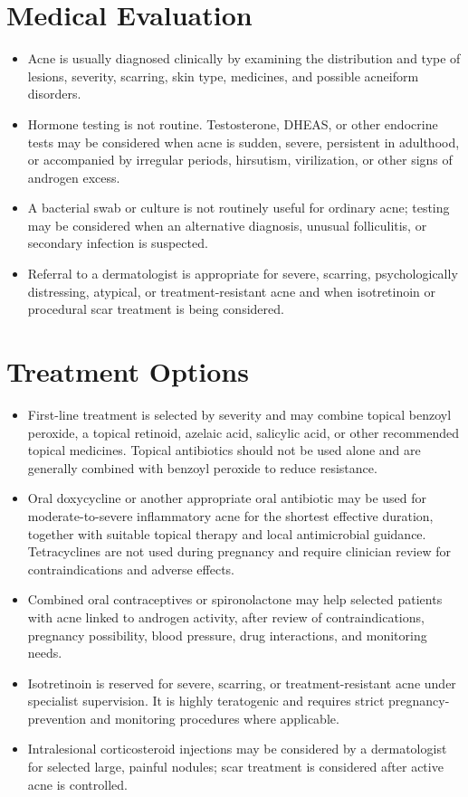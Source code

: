 \section*{Medical Evaluation}
\begin{itemize}
 \item Acne is usually diagnosed clinically by examining the distribution and type of lesions, severity, scarring, skin type, medicines, and possible acneiform disorders.
 \item Hormone testing is not routine. Testosterone, DHEAS, or other endocrine tests may be considered when acne is sudden, severe, persistent in adulthood, or accompanied by irregular periods, hirsutism, virilization, or other signs of androgen excess.
 \item A bacterial swab or culture is not routinely useful for ordinary acne; testing may be considered when an alternative diagnosis, unusual folliculitis, or secondary infection is suspected.
 \item Referral to a dermatologist is appropriate for severe, scarring, psychologically distressing, atypical, or treatment-resistant acne and when isotretinoin or procedural scar treatment is being considered.
\end{itemize}

\section*{Treatment Options}
\begin{itemize}
 \item First-line treatment is selected by severity and may combine topical benzoyl peroxide, a topical retinoid, azelaic acid, salicylic acid, or other recommended topical medicines. Topical antibiotics should not be used alone and are generally combined with benzoyl peroxide to reduce resistance.
 \item Oral doxycycline or another appropriate oral antibiotic may be used for moderate-to-severe inflammatory acne for the shortest effective duration, together with suitable topical therapy and local antimicrobial guidance. Tetracyclines are not used during pregnancy and require clinician review for contraindications and adverse effects.
 \item Combined oral contraceptives or spironolactone may help selected patients with acne linked to androgen activity, after review of contraindications, pregnancy possibility, blood pressure, drug interactions, and monitoring needs.
 \item Isotretinoin is reserved for severe, scarring, or treatment-resistant acne under specialist supervision. It is highly teratogenic and requires strict pregnancy-prevention and monitoring procedures where applicable.
 \item Intralesional corticosteroid injections may be considered by a dermatologist for selected large, painful nodules; scar treatment is considered after active acne is controlled.
\end{itemize}

